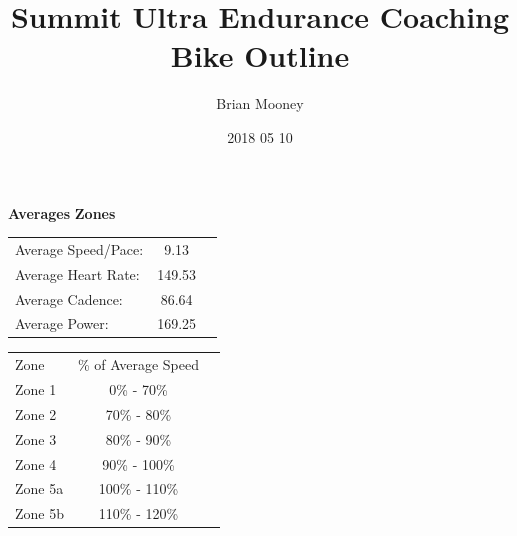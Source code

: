\documentclass{article}
\title{Summit Ultra Endurance Coaching\\
Bike Outline}
\author{Brian Mooney}
\date{2018 05 10}
\begin{document}
\maketitle
\begin{center}
\textbf{Averages}
\hspace{2in}
\textbf{Zones}
\end{center}
\begin{center}
\begin{tabular}{l c c}
Average Speed/Pace: & 9.13 \\
Average Heart Rate: & 149.53 \\
Average Cadence: & 86.64 \\
Average Power: & 169.25
\end{tabular}
\hspace{1in}
\begin{tabular}{l c c}
Zone & \% of Average Speed \\
Zone 1 & 0\% - 70\% \\
Zone 2 & 70\% - 80\% \\
Zone 3 & 80\% - 90\% \\
Zone 4 & 90\% - 100\% \\
Zone 5a & 100\% - 110\% \\
Zone 5b & 110\% - 120\% 
\end{tabular}
\end{center}
\end{document}

